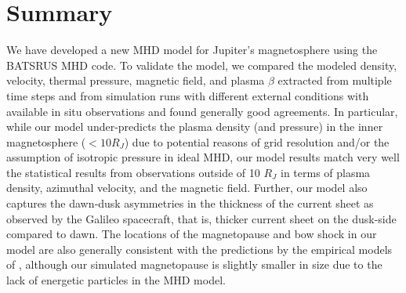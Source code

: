 \section{Summary}
We have developed a new MHD model for Jupiter's magnetosphere using the BATSRUS MHD code. To validate the model, we compared the modeled density, velocity, thermal pressure, magnetic field, and plasma $\beta$ extracted from multiple time steps and from simulation runs with different external conditions with available in situ observations and found generally good agreements. In particular, while our model under-predicts the plasma density (and pressure) in the inner magnetosphere ($<10 R_J$) due to potential reasons of grid resolution and/or the assumption of isotropic pressure in ideal MHD, our model results match very well the statistical results from observations outside of 10 $R_J$ in terms of plasma density, azimuthal velocity, and the magnetic field. Further, our model also captures the dawn‐dusk asymmetries in the thickness of the current sheet \cite{Khurana2005,Vogt2011a} as observed by the Galileo spacecraft, that is, thicker current sheet on the dusk-side compared to dawn. The locations of the magnetopause and bow shock in our model are also generally consistent with the predictions by the empirical models of \cite{Joy2002a}, although our simulated magnetopause is slightly smaller in size due to the lack of energetic particles in the MHD model. 